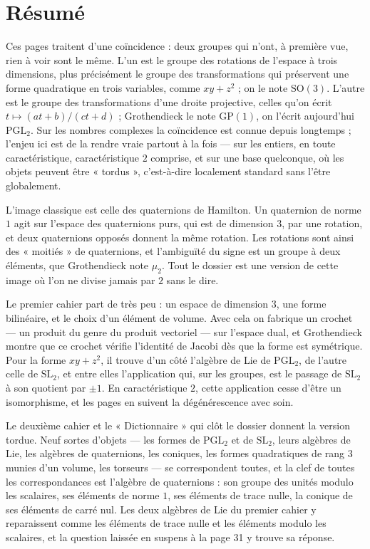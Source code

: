 \documentclass[11pt,a4paper]{article}
\begin{document}
\section*{Résumé}

\begin{resume}
Ces pages traitent d'une coïncidence : deux groupes qui n'ont, à première vue,
rien à voir sont le même. L'un est le groupe des rotations de l'espace à trois
dimensions, plus précisément le groupe des transformations qui préservent une
forme quadratique en trois variables, comme $xy + z^2$ ; on le note
$\mathrm{SO}(3)$. L'autre est le groupe des transformations d'une droite
projective, celles qu'on écrit $t \mapsto (at + b)/(ct + d)$ ; Grothendieck le
note $\mathrm{GP}(1)$, on l'écrit aujourd'hui $\mathrm{PGL}_2$. Sur les nombres
complexes la coïncidence est connue depuis longtemps ; l'enjeu ici est de la
rendre vraie partout à la fois — sur les entiers, en toute caractéristique,
caractéristique $2$ comprise, et sur une base quelconque, où les objets peuvent
être « tordus », c'est-à-dire localement standard sans l'être globalement.

L'image classique est celle des quaternions de Hamilton. Un quaternion de norme
$1$ agit sur l'espace des quaternions purs, qui est de dimension $3$, par une
rotation, et deux quaternions opposés donnent la même rotation. Les rotations
sont ainsi des « moitiés » de quaternions, et l'ambiguïté du signe est un
groupe à deux éléments, que Grothendieck note $\mu_2$. Tout le dossier est une
version de cette image où l'on ne divise jamais par $2$ sans le dire.

Le premier cahier part de très peu : un espace de dimension $3$, une forme
bilinéaire, et le choix d'un élément de volume. Avec cela on fabrique un
crochet — un produit du genre du produit vectoriel — sur l'espace dual, et
Grothendieck montre que ce crochet vérifie l'identité de Jacobi dès que la
forme est symétrique. Pour la forme $xy + z^2$, il trouve d'un côté l'algèbre
de Lie de $\mathrm{PGL}_2$, de l'autre celle de $\mathrm{SL}_2$, et entre elles
l'application qui, sur les groupes, est le passage de $\mathrm{SL}_2$ à son
quotient par $\pm 1$. En caractéristique $2$, cette application cesse d'être un
isomorphisme, et les pages en suivent la dégénérescence avec soin.

Le deuxième cahier et le « Dictionnaire » qui clôt le dossier donnent la
version tordue. Neuf sortes d'objets — les formes de $\mathrm{PGL}_2$ et de
$\mathrm{SL}_2$, leurs algèbres de Lie, les algèbres de quaternions, les
coniques, les formes quadratiques de rang $3$ munies d'un volume, les torseurs —
se correspondent toutes, et la clef de toutes les correspondances est
l'algèbre de quaternions : son groupe des unités modulo les scalaires,
ses éléments de norme $1$, ses éléments de trace nulle, la conique de ses
éléments de carré nul. Les deux algèbres de Lie du premier cahier y
reparaissent comme les éléments de trace nulle et les éléments modulo les
scalaires, et la question laissée en suspens à la page 31 y trouve sa réponse.


\end{resume}
\end{document}
